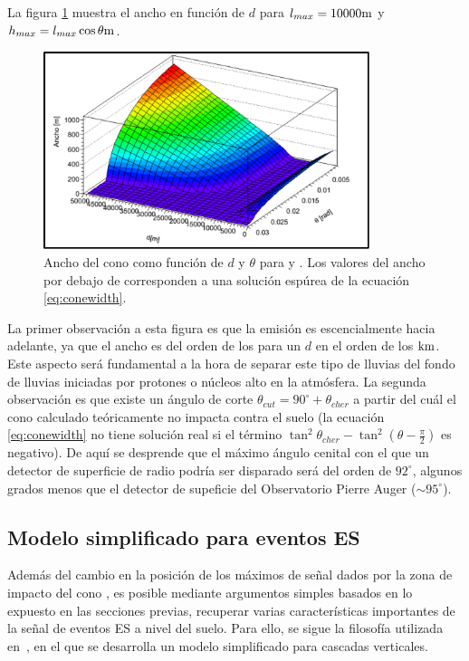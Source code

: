 	La figura \ref{fig:chConeWidth} muestra el ancho en función de $d$ para $l_{max}=10000 \rm m$ y $h_{max}=l_{max}\cos \theta \rm m$.
	\begin{figure}[ht!]
	\centering
		\includegraphics[width=0.85\textwidth]{fig/EASRadio/anchoLluvia}
		\caption{\label{fig:chConeWidth} Ancho del cono \cher{} como función de $d$ y $\theta$ para  y . Los valores del ancho por debajo de  corresponden a una solución espúrea de la ecuación \ref{eq:conewidth}.}
	\end{figure}
	La primer observación a esta figura es que la emisión es escencialmente hacia adelante, ya que el ancho es del orden de los  para un $d$ en el orden de los $\rm km$.
	Este aspecto será fundamental a la hora de separar este tipo de lluvias del fondo de lluvias iniciadas por protones o núcleos alto en la atmósfera.
	La segunda observación es que existe un ángulo de corte $\theta_{cut}=90^\circ+\theta_{cher}$ a partir del cuál el cono \cher{} calculado teóricamente no impacta contra el suelo (la ecuación \ref{eq:conewidth} no tiene solución real si el término $\tan^2 \theta_{cher}-\tan^2 (\theta-\frac{\pi}{2})$ es negativo).
	De aquí se desprende que el máximo ángulo cenital con el que un detector de superficie de radio podría ser disparado será del orden de $92^\circ$, algunos grados menos que el detector de supeficie del Observatorio Pierre Auger ($\sim95^\circ$).
	
	\subsection{Modelo simplificado para eventos ES}
	\label{sc:toymodelES}

	Adem\'as del cambio en la posici\'on de los m\'aximos de se\~nal dados por la zona de impacto del cono \cher{}, es posible mediante argumentos simples basados en lo expuesto en las secciones previas, recuperar varias caracter\'isticas importantes de la se\~nal de eventos ES a nivel del suelo.
	Para ello, se sigue la filosofía utilizada en~\cite{zhairezAir}, en el que se desarrolla un modelo simplificado para cascadas verticales.
	

